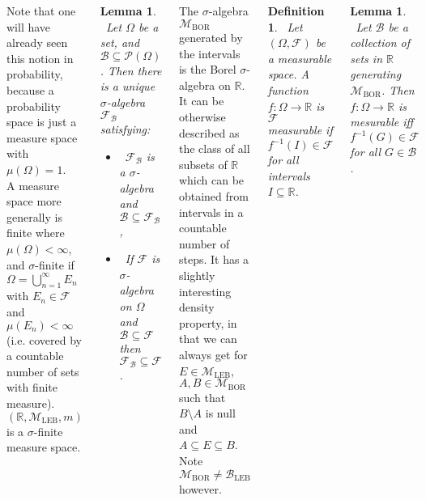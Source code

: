 \documentclass{tikzposter} %
\newtheorem{lemma}[theorem]{Lemma}
\newtheorem{definition}{Definition}
\begin{document}
\begin{columns}
{  Note that one will have already seen this notion in probability, because a probability space is just a measure space with $\mu(\Omega) = 1$. \\

  A measure space more generally is finite where $\mu(\Omega) < \infty$, and $\sigma$-finite if $\Omega = \bigcup_{n=1}^{\infty} E_{n}$ with $E_{n} \in \mathcal{F}$ and $\mu(E_{n}) < \infty$ (i.e. covered by a countable number of sets with finite measure). $(\mathbb{R}, \mathcal{M}_{\mathrm{LEB}}, m)$ is a $\sigma$-finite measure space.\\

  \begin{lemma}
    \ Let $\Omega$ be a set, and $\mathcal{B} \subseteq \mathcal{P}(\Omega)$. Then there is a unique $\sigma$-algebra $\mathcal{F}_{\mathcal{B}}$ satisfying:
    \begin{itemize}
      \item \ $\mathcal{F}_{\mathcal{B}}$ is a $\sigma$-algebra and $\mathcal{B} \subseteq \mathcal{F}_{\mathcal{B}}$,
      \item \ If $\mathcal{F}$ is $\sigma$-algebra on $\Omega$ and $\mathcal{B} \subseteq \mathcal{F}$ then $\mathcal{F}_{\mathcal{B}} \subseteq \mathcal{F}$.
    \end{itemize}
  \end{lemma}
  \hphantom{}

  The $\sigma$-algebra $\mathcal{M}_{\mathrm{BOR}}$ generated by the intervals is the Borel $\sigma$-algebra on $\mathbb{R}$. It can be otherwise described as the class of all subsets of $\mathbb{R}$ which can be obtained from intervals in a countable number of steps. It has a slightly interesting density property, in that we can always get for $E \in \mathcal{M}_{\mathrm{LEB}}$, $A, B \in \mathcal{M}_{\mathrm{BOR}}$ such that $B \setminus A$ is null and $A \subseteq E \subseteq B$. Note $\mathcal{M}_{\mathrm{BOR}} \neq \mathcal{B}_{\mathrm{LEB}}$ however. \\

  \begin{definition}
  \ Let $(\Omega, \mathcal{F})$ be a measurable space. A function $f : \Omega \to \mathbb{R}$ is $\mathcal{F}$ measurable if $f^{-1}(I) \in \mathcal{F}$ for all intervals $I \subseteq \mathbb{R}$.
  \end{definition}
  \hphantom{}

  \begin{lemma}
  \ Let $\mathcal{B}$ be a collection of sets in $\mathbb{R}$ generating $\mathcal{M}_{\mathrm{BOR}}$. Then $f : \Omega \to \mathbb{R}$ is mesurable iff $f^{-1}(G) \in \mathcal{F}$ for all $G \in \mathcal{B}$.
  \end{lemma}
  \hphantom{}

}
\end{columns}
\end{document}
